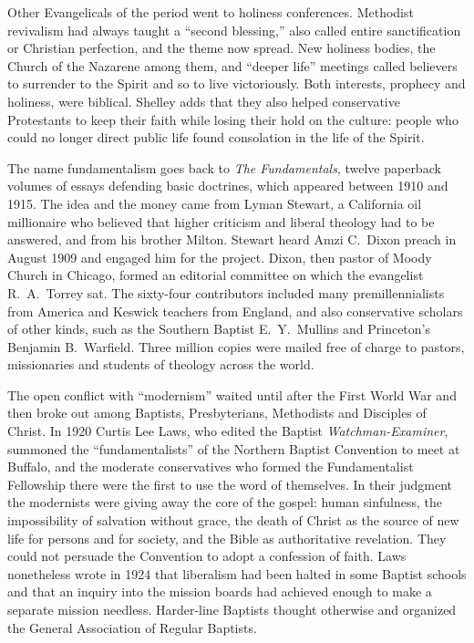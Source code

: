 Other Evangelicals of the period went to holiness conferences. Methodist revivalism had always taught
a ``second blessing,'' also called entire sanctification or Christian perfection, and the theme now
spread. New holiness bodies, the Church of the Nazarene among them, and ``deeper life'' meetings
called believers to surrender to the Spirit and so to live victoriously. Both interests, prophecy and
holiness, were biblical. Shelley adds that they also helped conservative Protestants to keep their
faith while losing their hold on the culture: people who could no longer direct public life found
consolation in the life of the Spirit.

The name fundamentalism goes back to \emph{The Fundamentals}, twelve paperback volumes of essays
defending basic doctrines, which appeared between 1910 and 1915. The idea and the money came from
Lyman Stewart, a California oil millionaire who believed that higher criticism and liberal theology
had to be answered, and from his brother Milton. Stewart heard Amzi C.~Dixon preach in August 1909
and engaged him for the project. Dixon, then pastor of Moody Church in Chicago, formed an editorial
committee on which the evangelist R.~A.~Torrey sat. The sixty-four contributors included many
premillennialists from America and Keswick teachers from England, and also conservative scholars of
other kinds, such as the Southern Baptist E.~Y.~Mullins and Princeton's Benjamin B.~Warfield. Three
million copies were mailed free of charge to pastors, missionaries and students of theology across
the world.

The open conflict with ``modernism'' waited until after the First World War and then broke out among
Baptists, Presbyterians, Methodists and Disciples of Christ. In 1920 Curtis Lee Laws, who edited the
Baptist \emph{Watchman-Examiner}, summoned the ``fundamentalists'' of the Northern Baptist Convention
to meet at Buffalo, and the moderate conservatives who formed the Fundamentalist Fellowship there
were the first to use the word of themselves. In their judgment the modernists were giving away the
core of the gospel: human sinfulness, the impossibility of salvation without grace, the death of
Christ as the source of new life for persons and for society, and the Bible as authoritative
revelation. They could not persuade the Convention to adopt a confession of faith. Laws nonetheless
wrote in 1924 that liberalism had been halted in some Baptist schools and that an inquiry into the
mission boards had achieved enough to make a separate mission needless. Harder-line Baptists thought
otherwise and organized the General Association of Regular Baptists.

